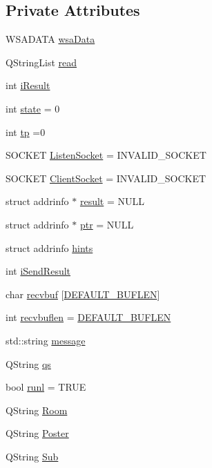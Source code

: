 \subsection*{Private Attributes}
\begin{DoxyCompactItemize}
\item 
W\+S\+A\+D\+A\+TA \mbox{\hyperlink{class_thread_af4e6c4fe4f46ba6b7c9218d3c02b9a20}{wsa\+Data}}
\item 
Q\+String\+List \mbox{\hyperlink{class_thread_a45dce23a8d89cb27b41f8823df44765b}{read}}
\item 
int \mbox{\hyperlink{class_thread_ac6084f44e9af9c2df1f58d77403468ec}{i\+Result}}
\item 
int \mbox{\hyperlink{class_thread_a0715eab05808859fe29d0f2915ee9899}{state}} = 0
\item 
int \mbox{\hyperlink{class_thread_a80dcf80149790844e887bdd9d3e47581}{tp}} =0
\item 
S\+O\+C\+K\+ET \mbox{\hyperlink{class_thread_a97ba65f7258f257c2098a134b09ec0c5}{Listen\+Socket}} = I\+N\+V\+A\+L\+I\+D\+\_\+\+S\+O\+C\+K\+ET
\item 
S\+O\+C\+K\+ET \mbox{\hyperlink{class_thread_a4ba1ac27a80f640f16522192482a490d}{Client\+Socket}} = I\+N\+V\+A\+L\+I\+D\+\_\+\+S\+O\+C\+K\+ET
\item 
struct addrinfo $\ast$ \mbox{\hyperlink{class_thread_ab24e019c57c28ad3116d26c8afeec89a}{result}} = N\+U\+LL
\item 
struct addrinfo $\ast$ \mbox{\hyperlink{class_thread_a40a0d1a3ecf39b32382c7838b6ced7bb}{ptr}} = N\+U\+LL
\item 
struct addrinfo \mbox{\hyperlink{class_thread_a548be7819a538cd747af578cd50e8cc0}{hints}}
\item 
int \mbox{\hyperlink{class_thread_aaab7b602b708cc86645e9d0e37790fa8}{i\+Send\+Result}}
\item 
char \mbox{\hyperlink{class_thread_a20474513ec818150b2162ad5604b2166}{recvbuf}} \mbox{[}\mbox{\hyperlink{thread_8h_a5261516a174b035b084a9ae06dc85730}{D\+E\+F\+A\+U\+L\+T\+\_\+\+B\+U\+F\+L\+EN}}\mbox{]}
\item 
int \mbox{\hyperlink{class_thread_abc47600f8570a82743be94f54b6092fd}{recvbuflen}} = \mbox{\hyperlink{thread_8h_a5261516a174b035b084a9ae06dc85730}{D\+E\+F\+A\+U\+L\+T\+\_\+\+B\+U\+F\+L\+EN}}
\item 
std\+::string \mbox{\hyperlink{class_thread_afed0854962aaacec661b4e746c28e13d}{message}}
\item 
Q\+String \mbox{\hyperlink{class_thread_a646b66f6fe01dde790ccf875bb112eb6}{qs}}
\item 
bool \mbox{\hyperlink{class_thread_ab516b75aa819bfec85f8cf0af28f7ddc}{runl}} = T\+R\+UE
\item 
Q\+String \mbox{\hyperlink{class_thread_a2deb54a8426f7deccbe806abb1134768}{Room}}
\item 
Q\+String \mbox{\hyperlink{class_thread_a4a60de5c09592bf2a778e04ded6e6441}{Poster}}
\item 
Q\+String \mbox{\hyperlink{class_thread_acbf38b0bc389598b66d3af13894c048f}{Sub}}
\end{DoxyCompactItemize}



